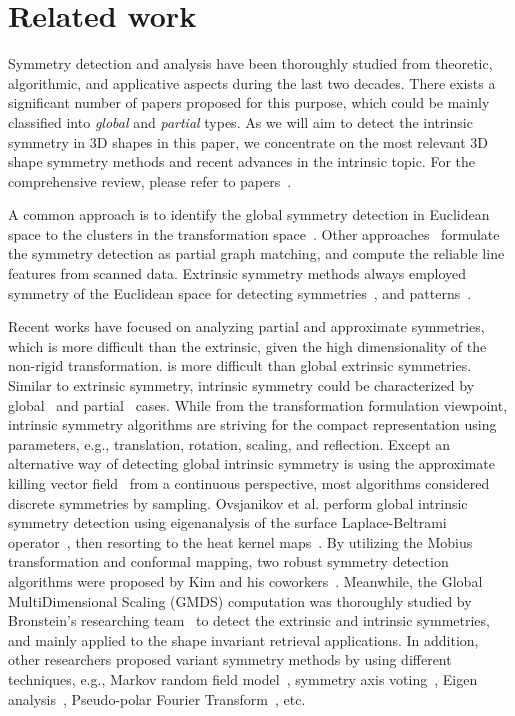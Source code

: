 \section{Related work}
\label{sec:related}

Symmetry detection and analysis have been thoroughly studied from theoretic, algorithmic, and applicative aspects during the last two decades.
There exists a significant number of papers proposed for this purpose, which could be mainly classified into \emph{global} and \emph{partial} types.
As we will aim to detect the intrinsic symmetry in 3D shapes in this paper, we concentrate on the most relevant 3D shape symmetry methods and recent advances in the intrinsic topic.
For the comprehensive review, please refer to papers~\cite{Xu2009,Berner2011}.

A common approach is to identify the global symmetry detection in Euclidean space to the clusters in the transformation space~\cite{mitra2006,podolak2006,pauly2008}. Other approaches~\cite{bokeloh2009,Berner2011} formulate the symmetry detection as partial graph matching, and compute the reliable line features from scanned data.
Extrinsic symmetry methods always employed symmetry of the Euclidean space for detecting symmetries~\cite{zabrodsky1997,mitra2006,podolak2006},
and patterns~\cite{pauly2008,bokeloh2009,yeh2009,Berner2011}.

Recent works have focused on analyzing partial and approximate symmetries, which is more difficult than the extrinsic, given the high dimensionality of the non-rigid transformation.
is more difficult than global extrinsic symmetries.
Similar to extrinsic symmetry, intrinsic symmetry could be characterized by global~\cite{ovsjanikov2008,bronstein2009,Ben-Chen2010,Bokeloh2010,Chertok2010,Lipman2010,Kim2010,Hooda2011,kim2011} and partial~\cite{Lasowski2009,Xu2009,Mitra2010,Raviv2010,Bronstein2011} cases. While from the transformation formulation viewpoint, intrinsic symmetry algorithms are striving for the compact representation using parameters, e.g., translation, rotation, scaling, and reflection. Except an alternative way of detecting global intrinsic symmetry is using the approximate killing vector field~\cite{Ben-Chen2010} from a continuous perspective, most algorithms considered discrete symmetries by sampling.
Ovsjanikov et al. perform global intrinsic symmetry detection using eigenanalysis of the surface Laplace-Beltrami operator~\cite{ovsjanikov2008}, then resorting to the heat kernel maps~\cite{Ovsjanikov2010}. By utilizing the Mobius transformation and conformal mapping, two robust symmetry detection algorithms were proposed by Kim and his coworkers~\cite{Kim2010,Kim2011}. Meanwhile, the Global MultiDimensional Scaling (GMDS) computation was thoroughly studied by Bronstein's researching team~\cite{bronstein2006,bronstein2009,Raviv2010,Bronstein2011} to detect the extrinsic and intrinsic symmetries, and mainly applied to the shape invariant retrieval applications. In addition, other researchers proposed variant symmetry methods by using different techniques, e.g., Markov random field model~\cite{Lasowski2009}, symmetry axis voting~\cite{Xu2009}, Eigen analysis~\cite{Chertok2010,Lipman2010}, Pseudo-polar Fourier Transform~\cite{Bermanis2010}, etc.

